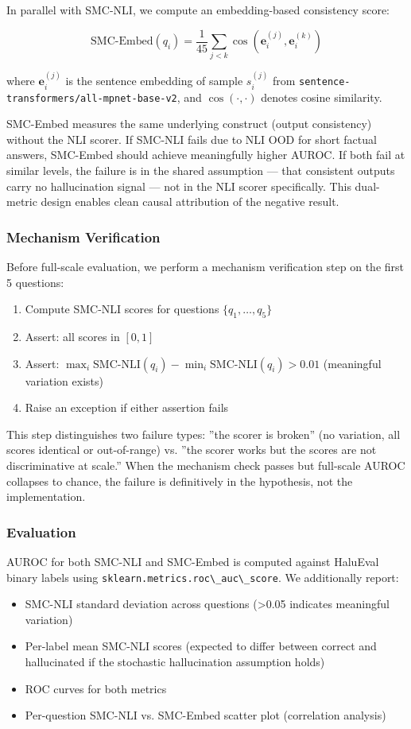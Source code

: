 In parallel with SMC-NLI, we compute an embedding-based consistency score:

$$\text{SMC-Embed}(q_i) = \frac{1}{45} \sum_{j < k} \cos\left(\mathbf{e}_i^{(j)}, \mathbf{e}_i^{(k)}\right)$$

where $\mathbf{e}_i^{(j)}$ is the sentence embedding of sample $s_i^{(j)}$ from \texttt{sentence-transformers/all-mpnet-base-v2}, and $\cos(\cdot, \cdot)$ denotes cosine similarity.

SMC-Embed measures the same underlying construct (output consistency) without the NLI scorer. If SMC-NLI fails due to NLI OOD for short factual answers, SMC-Embed should achieve meaningfully higher AUROC. If both fail at similar levels, the failure is in the shared assumption --- that consistent outputs carry no hallucination signal --- not in the NLI scorer specifically. This dual-metric design enables clean causal attribution of the negative result.

\subsubsection{Mechanism Verification}

Before full-scale evaluation, we perform a mechanism verification step on the first 5 questions:

\begin{enumerate}
\item Compute SMC-NLI scores for questions $\{q_1, \ldots, q_5\}$
\item Assert: all scores in $[0, 1]$
\item Assert: $\max_i \text{SMC-NLI}(q_i) - \min_i \text{SMC-NLI}(q_i) > 0.01$ (meaningful variation exists)
\item Raise an exception if either assertion fails
\end{enumerate}

This step distinguishes two failure types: ''the scorer is broken'' (no variation, all scores identical or out-of-range) vs. ''the scorer works but the scores are not discriminative at scale.'' When the mechanism check passes but full-scale AUROC collapses to chance, the failure is definitively in the hypothesis, not the implementation.

\subsubsection{Evaluation}

AUROC for both SMC-NLI and SMC-Embed is computed against HaluEval binary labels using \texttt{sklearn.metrics.roc\textbackslash \_auc\textbackslash \_score}. We additionally report:
\begin{itemize}
\item SMC-NLI standard deviation across questions (>0.05 indicates meaningful variation)
\item Per-label mean SMC-NLI scores (expected to differ between correct and hallucinated if the stochastic hallucination assumption holds)
\item ROC curves for both metrics
\item Per-question SMC-NLI vs. SMC-Embed scatter plot (correlation analysis)
\end{itemize}

